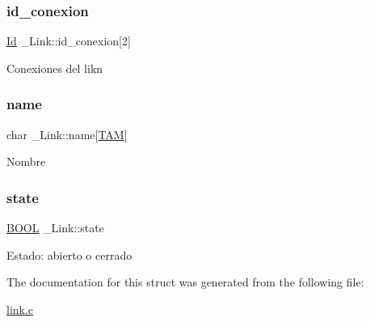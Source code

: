 \subsubsection{\texorpdfstring{id\+\_\+conexion}{id\_conexion}}
{\footnotesize\ttfamily \hyperlink{types_8h_a845e604fb28f7e3d97549da3448149d3}{Id} \+\_\+\+Link\+::id\+\_\+conexion\mbox{[}2\mbox{]}}

Conexiones del likn \mbox{\label{struct__Link_a5d81b67643f9c41056d8b199adbed77d}} 
\subsubsection{\texorpdfstring{name}{name}}
{\footnotesize\ttfamily char \+\_\+\+Link\+::name\mbox{[}\hyperlink{types_8h_ae0b4816fb45161ef9da5e6d6134ee28a}{T\+AM}\mbox{]}}

Nombre \mbox{\label{struct__Link_a82cc94a1764a428c2eaaa6ef60fb3949}} 
\subsubsection{\texorpdfstring{state}{state}}
{\footnotesize\ttfamily \hyperlink{types_8h_a3e5b8192e7d9ffaf3542f1210aec18dd}{B\+O\+OL} \+\_\+\+Link\+::state}

Estado\+: abierto o cerrado 

The documentation for this struct was generated from the following file\+:\begin{DoxyCompactItemize}
\item 
\hyperlink{link_8c}{link.\+c}\end{DoxyCompactItemize}
